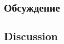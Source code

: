 \begin{Russian}
\section{Обсуждение}
\end{Russian}
\begin{English}
\section{Discussion}
\end{English}
\label{sec:discussion}

\begin{Russian}

\end{Russian}
\begin{English}

\end{English}


